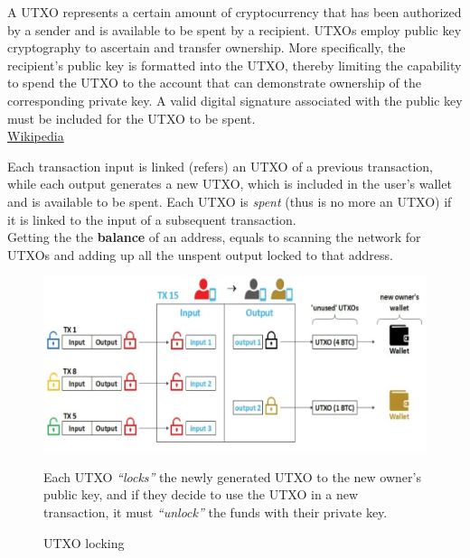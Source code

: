 \begin{definition}[UTXO]
   \label{def:UTXO}
   A UTXO represents a certain amount of cryptocurrency that has been authorized by a sender and is available to be spent by a recipient.
   UTXOs employ public key cryptography to ascertain and transfer ownership. More specifically, the recipient's public key is formatted into the UTXO, thereby limiting the capability to spend the UTXO to the account that can demonstrate ownership of the corresponding private key. A valid digital signature associated with the public key must be included for the UTXO to be spent.\\
   \href{https://en.wikipedia.org/wiki/Unspent_transaction_output}{Wikipedia}
\end{definition}

Each transaction input is linked (refers) an UTXO of
a previous transaction, while each output generates a new UTXO, which is included in the user's wallet and is available to be spent.
Each UTXO is \textit{spent} (thus is no more an UTXO) if it is linked to the input of a subsequent transaction.\\
Getting the the \textbf{balance} of an address, equals to scanning the network for UTXOs and adding up all the unspent output locked to that address.

\begin{figure}[htbp]
   \centering
   \includegraphics{images/bitcoin_UTXO.png}
   \caption{UTXO locking}

   Each UTXO \textit{``locks''} the newly generated UTXO to the new owner's public key, and if they decide to use the UTXO in a new transaction, it must \textit{``unlock''} the funds with their private key.
   \label{fig:bitcoin_UTXO}
\end{figure}

